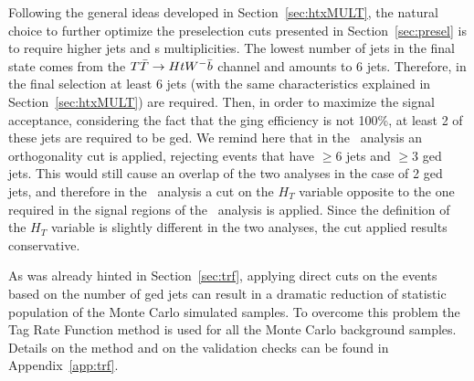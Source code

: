 Following the general ideas developed in Section~\ref{sec:htxMULT}, the
natural choice to further optimize the preselection cuts presented in 
Section~\ref{sec:presel} is to require higher jets and \bjet s multiplicities.
The lowest number of jets in the final state comes from the $\TTbar\to HtW^-\bar{b}$
channel and amounts to 6 jets. Therefore, in the final selection at least 6 jets
(with the same characteristics explained in Section~\ref{sec:htxMULT}) are required.
Then, in order to maximize the signal acceptance, considering the fact that the
\btag ging efficiency is not 100\%, at least 2 of these jets are
required to be \btag ged.
We remind here that in the \wbx\ analysis an orthogonality
cut is applied, rejecting events that have $\geq 6$ jets and $\geq 3$
\btag ged jets. This would still cause an overlap of the two analyses
in the case of 2 \btag ged jets, and therefore in the \htx\ analysis
a cut on the $H_T$ variable opposite to the one required in the 
signal regions of the \wbx\ analysis is applied. 
Since the definition of the $H_T$ variable is slightly different 
in the two analyses, the cut applied results conservative.

As was already hinted in Section~\ref{sec:trf}, 
applying direct cuts on the events based on the number of \btag ged jets
can result in a dramatic reduction of statistic population of the Monte
Carlo simulated samples. To overcome this problem the Tag Rate Function
method is used for all the Monte Carlo background samples. Details on
the method and on the validation checks can be found in Appendix~\ref{app:trf}.

